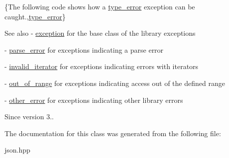 \{The following code shows how a {\ttfamily \mbox{\hyperlink{classnlohmann_1_1detail_1_1type__error}{type\+\_\+error}}} exception can be caught.,\mbox{\hyperlink{classnlohmann_1_1detail_1_1type__error}{type\+\_\+error}}\}

\begin{DoxySeeAlso}{See also}
-\/ \mbox{\hyperlink{classnlohmann_1_1detail_1_1exception}{exception}} for the base class of the library exceptions 

-\/ \mbox{\hyperlink{classnlohmann_1_1detail_1_1parse__error}{parse\+\_\+error}} for exceptions indicating a parse error 

-\/ \mbox{\hyperlink{classnlohmann_1_1detail_1_1invalid__iterator}{invalid\+\_\+iterator}} for exceptions indicating errors with iterators 

-\/ \mbox{\hyperlink{classnlohmann_1_1detail_1_1out__of__range}{out\+\_\+of\+\_\+range}} for exceptions indicating access out of the defined range 

-\/ \mbox{\hyperlink{classnlohmann_1_1detail_1_1other__error}{other\+\_\+error}} for exceptions indicating other library errors
\end{DoxySeeAlso}
\begin{DoxySince}{Since}
version 3.. 
\end{DoxySince}


The documentation for this class was generated from the following file\+:\begin{DoxyCompactItemize}
\item 
json.\+hpp\end{DoxyCompactItemize}

